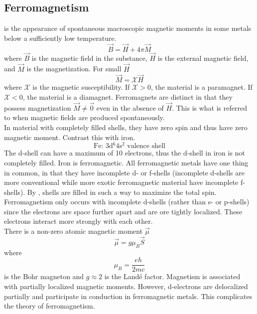 \documentclass[12pt,a4paper,titlepage]{article}
\newcommand{\trm}[1]{\textrm{#1}} %
\newcommand{\ul}[1]{\underline{\smash{#1}}} %
\newcommand{\Chi}{\mathcal{X}} %
\begin{document}
\subsection{Ferromagnetism}
\ul{Ferromagnetism} is the appearance of spontaneous macroscopic magnetic moments in some metals below a sufficiently low temperature.
\begin{equation}
\vec{B}=\vec{H}+4\pi\vec{M}
\end{equation}
where $\vec{B}$ is the magnetic field in the substance, $\vec{H}$ is the external magnetic field, and $\vec{M}$ is the magnetization. For small $\vec{H}$
\begin{equation}
\vec{M}=\Chi\vec{H}
\end{equation}
where $\Chi$ is the magnetic susceptibility. If $\Chi>0$, the material is a paramagnet. If $\Chi<0$, the material is a diamagnet. Ferromagnets are distinct in that they possess magnetization $\vec{M}\neq\vec{0}$ even in the absence of $\vec{H}$. This is what is referred to when magnetic fields are produced spontaneously.\\

In material with completely filled shells, they have zero spin and thus have zero magnetic moment. Contrast this with iron.
\[\trm{Fe: 3d$^{6}$4s$^{2}$ valence shell}\]
The d-shell can have a maximum of 10 electrons, thus the d-shell in iron is not completely filled. Iron is ferromagnetic. All ferromagnetic metals have one thing in common, in that they have incomplete d- or f-shells (incomplete d-shells are more conventional while more exotic ferromagnetic material have incomplete f-shells). By \ul{Hund's rule}, shells are filled in such a way to maximize the total spin. Ferromagnetism only occurs with incomplete d-shells (rather than s- or p-shells) since the electrons are space further apart and are ore tightly localized. These electrons interact more strongly with each other.\\

There is a non-zero atomic magnetic moment $\vec{\mu}$
\begin{equation}
\vec{\mu}=g\mu_{B}\vec{S}
\end{equation}
where
\begin{equation}
\mu_{B}=\frac{eh}{2mc}
\end{equation}
is the Bohr magneton and $g\approx2$ is the Land\'{e} factor. Magnetism is associated with partially localized magnetic moments. However, d-electrons are delocalized partially and participate in conduction in ferromagnetic metals. This complicates the theory of ferromagnetism.\\
\end{document}
